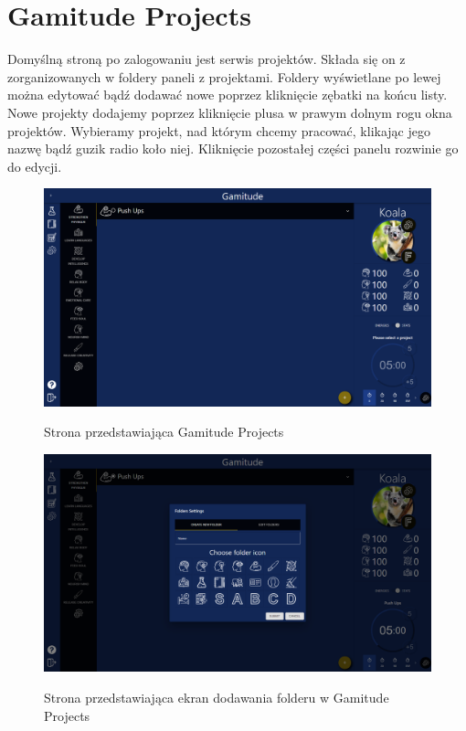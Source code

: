 \documentclass[a4paper,11pt]{report}
\begin{document}
\section{Gamitude Projects}
Domyślną stroną po zalogowaniu jest serwis projektów.
Składa się on z zorganizowanych w foldery paneli z projektami.
Foldery wyświetlane po lewej można edytować bądź dodawać nowe poprzez kliknięcie zębatki na końcu listy.
Nowe projekty dodajemy poprzez kliknięcie plusa w prawym dolnym rogu okna projektów.
Wybieramy projekt, nad którym chcemy pracować, klikając jego nazwę bądź guzik radio koło niej.
Kliknięcie pozostałej części panelu rozwinie go do edycji.
\begin{figure}[H]
	\centering
	\includegraphics[scale=0.3]{prezentacja/Projects}\\
	\caption{Strona przedstawiająca Gamitude Projects}
	\label{fig:Projects}
\end{figure}
\begin{figure}[H]
	\centering
	\includegraphics[scale=0.3]{prezentacja/Folders_add}\\
	\caption{Strona przedstawiająca ekran dodawania folderu w Gamitude Projects}
	\label{fig:Folders_add}
\end{figure}
\end{document}
